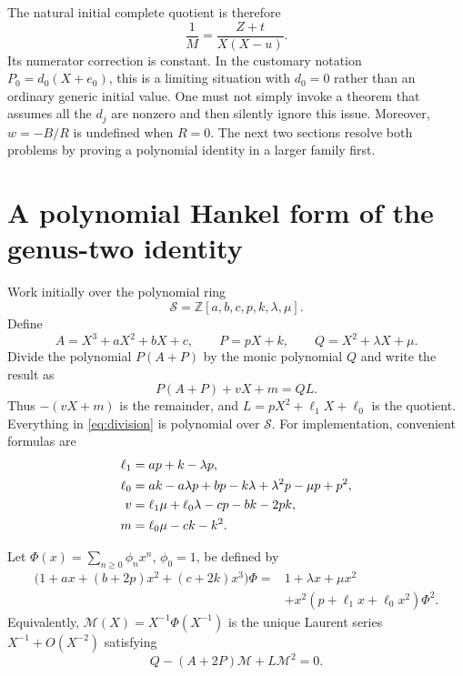 \documentclass[11pt,a4paper]{article}
\numberwithin{equation}{section}
\theoremstyle{definition}
\newcommand{\Z}{\mathbb Z}
\begin{document}
The natural initial complete quotient is therefore
\[
 \frac1M=\frac{Z+t}{X(X-u)}.
\]
Its numerator correction is constant. In the customary notation
$P_0=d_0(X+e_0)$, this is a limiting situation with $d_0=0$ rather than an
ordinary generic initial value. One must not simply invoke a theorem that
assumes all the $d_j$ are nonzero and then silently ignore this issue.
Moreover, $w=-B/R$ is undefined when $R=0$. The next two sections resolve
both problems by proving a polynomial identity in a larger family first.

\section{A polynomial Hankel form of the genus-two identity}

Work initially over the polynomial ring
\[
 \mathcal S=\Z[a,b,c,p,k,\lambda,\mu].
\]
Define
\begin{equation}\label{eq:univpolys}
 A=X^3+aX^2+bX+c,\qquad P=pX+k,\qquad Q=X^2+\lambda X+\mu.
\end{equation}
Divide the polynomial $P(A+P)$ by the monic polynomial $Q$ and write the
result as
\begin{equation}\label{eq:division}
 P(A+P)+vX+m=QL.
\end{equation}
Thus $-(vX+m)$ is the remainder, and $L=pX^2+\ell_1X+\ell_0$ is the quotient.
Everything in \eqref{eq:division} is polynomial over $\mathcal S$. For
implementation, convenient formulas are
\begin{align}\label{eq:univcoeffs}
 \ell_1&=ap+k-\lambda p,\\
 \ell_0&=ak-a\lambda p+bp-k\lambda+\lambda^2p-\mu p+p^2,\notag\\
 v&=\ell_1\mu+\ell_0\lambda-cp-bk-2pk,\notag\\
 m&=\ell_0\mu-ck-k^2.\notag
\end{align}

Let $\Phi(x)=\sum_{n\geq0}\phi_nx^n$, $\phi_0=1$, be defined by
\begin{equation}\label{eq:univGF}
 \begin{split}
 \bigl(1+ax+(b+2p)x^2+(c+2k)x^3\bigr)\Phi
  ={}&1+\lambda x+\mu x^2\\
  &+x^2(p+\ell_1x+\ell_0x^2)\Phi^2.
 \end{split}
\end{equation}
Equivalently, $\mathcal M(X)=X^{-1}\Phi(X^{-1})$ is the unique Laurent series
$X^{-1}+O(X^{-2})$ satisfying
\begin{equation}\label{eq:univM}
 Q-(A+2P)\mathcal M+L\mathcal M^2=0.
\end{equation}
\end{document}
